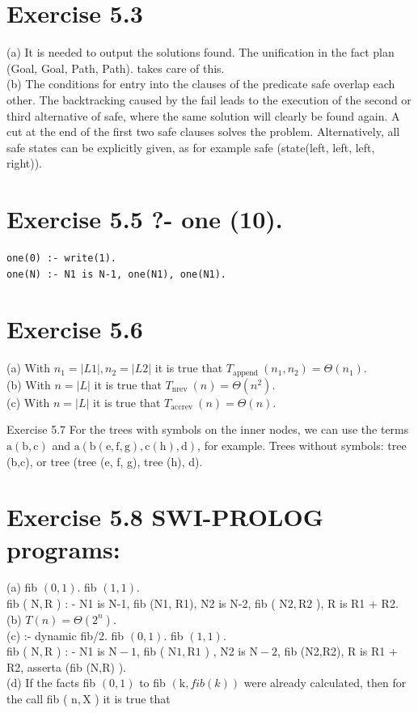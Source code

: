 \documentclass[10pt]{article}
\begin{document}
\section*{Exercise 5.3}
(a) It is needed to output the solutions found. The unification in the fact plan (Goal, Goal, Path, Path). takes care of this.\\

(b) The conditions for entry into the clauses of the predicate safe overlap each other. The backtracking caused by the fail leads to the execution of the second or third alternative of safe, where the same solution will clearly be found again. A cut at the end of the first two safe clauses solves the problem. Alternatively, all safe states can be explicitly given, as for example safe (state(left, left, left, right)).

\section*{Exercise 5.5 ?- one (10).}
\begin{verbatim}
one(0) :- write(1).
one(N) :- N1 is N-1, one(N1), one(N1).
\end{verbatim}

\section*{Exercise 5.6}
(a) With $n_{1}=|L 1|, n_{2}=|L 2|$ it is true that $T_{\text {append }}\left(n_{1}, n_{2}\right)=\Theta\left(n_{1}\right)$.\\
(b) With $n=|L|$ it is true that $T_{\text {nrev }}(n)=\Theta\left(n^{2}\right)$.\\
(c) With $n=|L|$ it is true that $T_{\text {accrev }}(n)=\Theta(n)$.

Exercise 5.7 For the trees with symbols on the inner nodes, we can use the terms $\mathrm{a}(\mathrm{b}, \mathrm{c})$ and $\mathrm{a}(\mathrm{b}(\mathrm{e}, \mathrm{f}, \mathrm{g}), \mathrm{c}(\mathrm{h}), \mathrm{d})$, for example. Trees without symbols: tree (b,c), or tree (tree (e, f, g), tree (h), d).

\section*{Exercise 5.8 SWI-PROLOG programs:}
(a) fib $(0,1)$. fib $(1,1)$.\\
fib ( $\mathrm{N}, \mathrm{R}$ ) : - N1 is N-1, fib (N1, R1), N2 is N-2, fib ( $\mathrm{N} 2, \mathrm{R} 2$ ), R is R1 + R2.\\
(b) $T(n)=\Theta\left(2^{n}\right)$.\\
(c) :- dynamic fib/2. fib $(0,1)$. fib $(1,1)$.\\
fib ( $\mathrm{N}, \mathrm{R}$ ) : - N1 is $\mathrm{N}-1$, fib ( $\mathrm{N} 1, \mathrm{R} 1$ ) , N2 is $\mathrm{N}-2$, fib (N2,R2), R is R1 + R2, asserta (fib (N,R) ).\\
(d) If the facts fib $(0,1)$ to fib $(\mathrm{k}, f i b(k))$ were already calculated, then for the call fib ( $\mathrm{n}, \mathrm{X}$ ) it is true that
\end{document}
